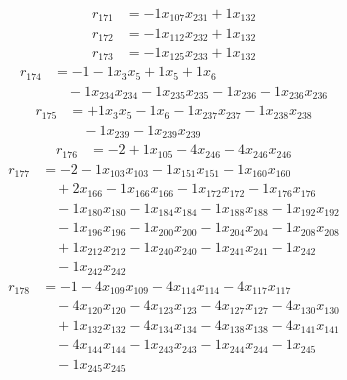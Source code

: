 \[\begin{aligned}
r_{171} &= - 1 x_{107} x_{231} + 1 x_{132}
\end{aligned}\]
\[\begin{aligned}
r_{172} &= - 1 x_{112} x_{232} + 1 x_{132}
\end{aligned}\]
\[\begin{aligned}
r_{173} &= - 1 x_{125} x_{233} + 1 x_{132}
\end{aligned}\]
\[\begin{aligned}
r_{174} &= - 1 - 1 x_{3} x_{5} + 1 x_{5} + 1 x_{6} \\
 &\quad - 1 x_{234} x_{234} - 1 x_{235} x_{235} - 1 x_{236} - 1 x_{236} x_{236}
\end{aligned}\]
\[\begin{aligned}
r_{175} &= + 1 x_{3} x_{5} - 1 x_{6} - 1 x_{237} x_{237} - 1 x_{238} x_{238} \\
 &\quad - 1 x_{239} - 1 x_{239} x_{239}
\end{aligned}\]
\[\begin{aligned}
r_{176} &= - 2 + 1 x_{105} - 4 x_{246} - 4 x_{246} x_{246}
\end{aligned}\]
\[\begin{aligned}
r_{177} &= - 2 - 1 x_{103} x_{103} - 1 x_{151} x_{151} - 1 x_{160} x_{160} \\
 &\quad + 2 x_{166} - 1 x_{166} x_{166} - 1 x_{172} x_{172} - 1 x_{176} x_{176} \\
 &\quad - 1 x_{180} x_{180} - 1 x_{184} x_{184} - 1 x_{188} x_{188} - 1 x_{192} x_{192} \\
 &\quad - 1 x_{196} x_{196} - 1 x_{200} x_{200} - 1 x_{204} x_{204} - 1 x_{208} x_{208} \\
 &\quad + 1 x_{212} x_{212} - 1 x_{240} x_{240} - 1 x_{241} x_{241} - 1 x_{242} \\
 &\quad - 1 x_{242} x_{242}
\end{aligned}\]
\[\begin{aligned}
r_{178} &= - 1 - 4 x_{109} x_{109} - 4 x_{114} x_{114} - 4 x_{117} x_{117} \\
 &\quad - 4 x_{120} x_{120} - 4 x_{123} x_{123} - 4 x_{127} x_{127} - 4 x_{130} x_{130} \\
 &\quad + 1 x_{132} x_{132} - 4 x_{134} x_{134} - 4 x_{138} x_{138} - 4 x_{141} x_{141} \\
 &\quad - 4 x_{144} x_{144} - 1 x_{243} x_{243} - 1 x_{244} x_{244} - 1 x_{245} \\
 &\quad - 1 x_{245} x_{245}
\end{aligned}\]
\endgroup
